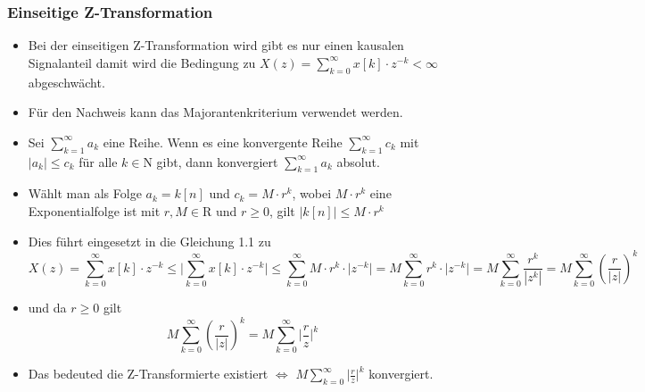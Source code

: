 \documentclass[11pt]{article}
\providecommand{\tightlist}{%
      \setlength{\itemsep}{0pt}\setlength{\parskip}{0pt}}
\begin{document}
    \subsubsection{Einseitige
Z-Transformation}\label{einseitige-z-transformation}

\begin{itemize}
\item
  Bei der einseitigen Z-Transformation wird gibt es nur einen kausalen
  Signalanteil damit wird die Bedingung zu
  \(X(z) = \sum_{k=0}^\infty x[k] \cdot z^{-k} < \infty\) abgeschwächt.
\item
  Für den Nachweis kann das Majorantenkriterium verwendet werden.
\end{itemize}

    \begin{itemize}
\tightlist
\item
  Sei \(\sum_{k=1}^\infty a_k\) eine Reihe. Wenn es eine konvergente
  Reihe \(\sum_{k=1}^\infty c_k\) mit \(\big|a_k\big| \leqslant c_k\)
  für alle \(k \in \mathrm{N}\) gibt, dann konvergiert
  \(\sum_{k=1}^\infty a_k\) absolut.
\end{itemize}

    \begin{itemize}
\tightlist
\item
  Wählt man als Folge \(a_k = k[n]\) und \(c_k = M \cdot r^k\), wobei
  \(M \cdot r^k\) eine Exponentialfolge ist mit \(r, M \in \mathrm{R}\)
  und \(r \geq 0\), gilt \(\big|k[n]\big| \leqslant M \cdot r^k\)
\end{itemize}

    \begin{itemize}
\tightlist
\item
  Dies führt eingesetzt in die Gleichung 1.1 zu
  \[X(z) = \sum_{k=0}^\infty x[k] \cdot z^{-k} \leqslant \big| \sum_{k=0}^\infty x[k] \cdot z^{-k} \big| \leqslant \sum_{k=0}^\infty M \cdot r^k \cdot \big| z^{-k} \big| = M \sum_{k=0}^\infty r^k \cdot \big| z^{-k} \big| =  M \sum_{k=0}^\infty \frac {r^k}  {|z^{k}|} = M \sum_{k=0}^\infty (\frac {r}  {|z|})^k\]
\end{itemize}

    \begin{itemize}
\tightlist
\item
  und da \(r \geq 0\) gilt
  \[M \sum_{k=0}^\infty (\frac {r}  {|z|})^k = M \sum_{k=0}^\infty \big|\frac {r}  {z}\big|^k\]
\end{itemize}

    \begin{itemize}
\tightlist
\item
  Das bedeuted die Z-Transformierte existiert \(\iff\)
  \(M \sum_{k=0}^\infty \big|\frac {r} {z}\big|^k\) konvergiert.
\end{itemize}
\end{document}
